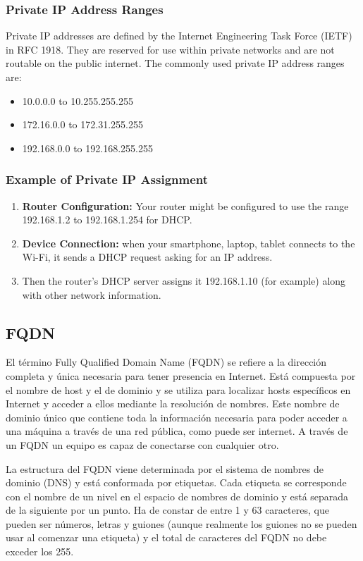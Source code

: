 \documentclass{article}
\begin{document}
\subsubsection{Private IP Address Ranges}

Private IP addresses are defined by the Internet Engineering Task Force (IETF) in RFC 1918. They are reserved for use within private networks and are not routable on the public internet. The commonly used private IP address ranges are:

\begin{itemize}
    \item 10.0.0.0 to 10.255.255.255
    \item 172.16.0.0 to 172.31.255.255
    \item 192.168.0.0 to 192.168.255.255
\end{itemize}

\subsubsection{Example of Private IP Assignment}
\begin{enumerate}
    \item \textbf{Router Configuration:} Your router might be configured to use the range 192.168.1.2 to 192.168.1.254 for DHCP.
    \item \textbf{Device Connection:} when your smartphone, laptop, tablet connects to the Wi-Fi, it sends a DHCP request asking for an IP address.
    \item Then the router's DHCP server assigns it 192.168.1.10 (for example) along with other network information.
\end{enumerate}



\subsection{FQDN} \label{FQDN}
El término Fully Qualified Domain Name (FQDN) se refiere a la dirección completa y única necesaria para tener presencia en Internet. Está compuesta por el nombre de host y el de dominio y se utiliza para localizar hosts específicos en Internet y acceder a ellos mediante la resolución de nombres. Este nombre de dominio único que contiene toda la información necesaria para poder acceder a una máquina a través de una red pública, como puede ser internet. A través de un FQDN un equipo es capaz de conectarse con cualquier otro.

La estructura del FQDN viene determinada por el sistema de nombres de dominio (DNS) y está conformada por etiquetas. Cada etiqueta se corresponde con el nombre de un nivel en el espacio de nombres de dominio y está separada de la siguiente por un punto. Ha de constar de entre 1 y 63 caracteres, que pueden ser números, letras y guiones (aunque realmente los guiones no se pueden usar al comenzar una etiqueta) y el total de caracteres del FQDN no debe exceder los 255. 
\end{document}
